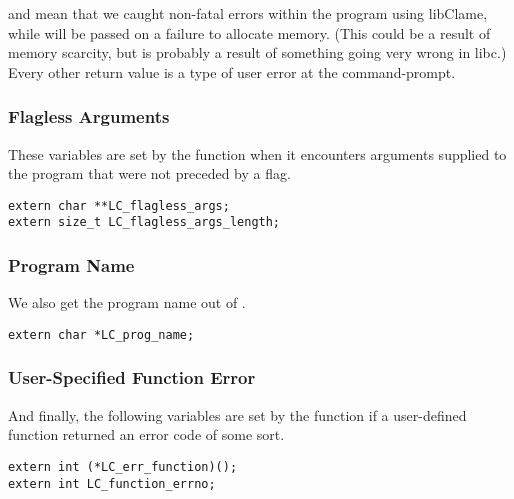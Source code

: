  and  mean that we caught non-fatal errors within the program using libClame, while  will be passed on a failure to allocate memory. (This could be a result of memory scarcity, but is probably a result of something going very wrong in libc.) Every other return value is a type of user error at the command-prompt.

\subsubsection{Flagless Arguments}

These variables are set by the  function when it encounters arguments supplied to the program that were not preceded by a flag.

\begin{verbatim}
extern char **LC_flagless_args;
extern size_t LC_flagless_args_length;
\end{verbatim}

\subsubsection{Program Name}

We also get the program name out of .

\begin{verbatim}
extern char *LC_prog_name;
\end{verbatim}

\subsubsection{User-Specified Function Error}

And finally, the following variables are set by the  function if a user-defined function returned an error code of some sort.

\begin{verbatim}
extern int (*LC_err_function)();
extern int LC_function_errno;
\end{verbatim}
